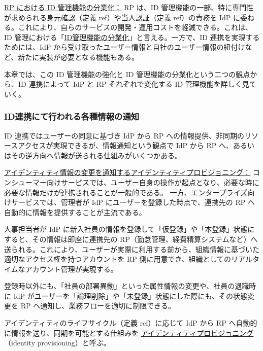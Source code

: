 \documentclass[uplatex]{jsarticle}
\def\ref#1{ref}%
\def\label#1{}%
\begin{document}
\underline{RP における ID 管理機能の分業化：}
RP は、ID 管理機能の一部、特に専門性が求められる身元確認（定義 \ref{dfn:identity-proofing}）や当人認証（定義 \ref{dfn:authentication}）の責務を IdP に委ねる。これにより、自らのサービスの開発・運用コストを軽減できる。これは、ID 管理における「\underline{ID管理機能の分業化}」と言える。一方で、ID 連携を実現するためには、IdP から受け取ったユーザー情報と自社のユーザー情報の紐付けなど、新たに実装が必要となる機能もある。

本章では、この ID 管理機能の強化と ID 管理機能の分業化という二つの観点から、ID 連携によって IdP と RP それぞれで変化する ID 管理機能を詳しく見ていく。

\subsubsection{ID連携にて行われる各種情報の通知}

ID 連携ではユーザーの同意に基づき IdP から RP への情報提供、非同期のリソースアクセスが実現できるが、情報通知という観点で IdP から RP へ、あるいはその逆方向へ情報が送られる仕組みがいくつかある。

\underline{アイデンティティ情報の変更を通知するアイデンティティプロビジョニング：}
コンシューマー向けサービスでは、ユーザー自身の操作が起点となり、必要な時に必要な情報だけが連携されることが一般的である。
一方、エンタープライズ向けサービスでは、管理者が IdP にユーザーを登録した時点で、連携先の RP へ自動的に情報を提供することが主流である。

\begin{exa}[エンタープライズ向けサービスにおける新入社員の登録]\label{exa:ch4-enterprise-provisioning}
人事担当者が IdP に新入社員の情報を登録して「仮登録」や「本登録」状態にすると、その情報は即座に連携先の RP（勤怠管理、経費精算システムなど）へ送られる。これにより、ユーザーが実際に利用する前から、組織情報に基づいた適切なアクセス権を持つアカウントを RP 側に用意でき、組織としてのリアルタイムなアカウント管理が実現する。
\end{exa}

登録時以外にも、「社員の部署異動」といった属性情報の変更や、社員の退職時に IdP がユーザーを「論理削除」や「未登録」状態にした際にも、その状態変更を RP へ通知し、業務フローを適切に制限できる。

\begin{dfn}[アイデンティティプロビジョニング]\label{dfn:identity-provisioning}
アイデンティティのライフサイクル（定義 \ref{dfn:identity-lifecycle}）に応じて IdP から RP へ自動的に情報を送り、同期を可能とする仕組みを \underline{アイデンティティプロビジョニング}（identity provisioning）と呼ぶ。
\end{dfn}
\end{document}
